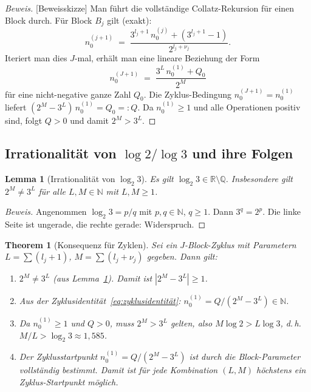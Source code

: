 \documentclass[12pt,a4paper]{article}
\newtheorem{theorem}[definition]{Theorem}
\newtheorem{lemma}[definition]{Lemma}
\newenvironment{beweis}{\begin{proof}[Beweis]}{\end{proof}}
\newcommand{\N}{\mathbb{N}}
\newcommand{\R}{\mathbb{R}}
\newcommand{\Q}{\mathbb{Q}}
\begin{document}
\begin{beweis}[Beweisskizze]
Man führt die vollständige Collatz-Rekursion für einen Block durch.
Für Block $B_j$ gilt (exakt):
\[
  n_0^{(j+1)} \;=\; \frac{3^{l_j+1}\,n_0^{(j)} + (3^{l_j+1}-1)}{2^{l_j+\nu_j}}.
\]
Iteriert man dies $J$-mal, erhält man eine lineare Beziehung der Form
\[
  n_0^{(J+1)} \;=\; \frac{3^L\,n_0^{(1)} + Q_0}{2^M}
\]
für eine nicht-negative ganze Zahl $Q_0$. Die Zyklus-Bedingung
$n_0^{(J+1)} = n_0^{(1)}$ liefert
$(2^M - 3^L)\,n_0^{(1)} = Q_0 =: Q$. Da $n_0^{(1)} \geq 1$ und alle
Operationen positiv sind, folgt $Q > 0$ und damit $2^M > 3^L$.
\end{beweis}

\subsection{Irrationalität von $\log 2 / \log 3$ und ihre Folgen}

\begin{lemma}[Irrationalität von $\log_2 3$]
\label{lem:irrational}
Es gilt $\log_2 3 \in \R \setminus \Q$. Insbesondere gilt $2^M \neq 3^L$
für alle $L, M \in \N$ mit $L, M \geq 1$.
\end{lemma}

\begin{beweis}
Angenommen $\log_2 3 = p/q$ mit $p, q \in \N$, $q \geq 1$. Dann
$3^q = 2^p$. Die linke Seite ist ungerade, die rechte gerade: Widerspruch.
\end{beweis}

\begin{theorem}[Konsequenz für Zyklen]
\label{thm:zyklen-einschränkung}
Sei ein $J$-Block-Zyklus mit Parametern $L = \sum(l_j+1)$,
$M = \sum(l_j+\nu_j)$ gegeben. Dann gilt:
\begin{enumerate}[label=\upshape(\roman*)]
  \item $2^M \neq 3^L$ (aus Lemma~\ref{lem:irrational}). Damit ist
    $|2^M - 3^L| \geq 1$.
  \item Aus der Zyklusidentität~\eqref{eq:zyklusidentität}:
    $n_0^{(1)} = Q/(2^M - 3^L) \in \N$.
  \item Da $n_0^{(1)} \geq 1$ und $Q > 0$, muss $2^M > 3^L$ gelten,
    also $M\log 2 > L\log 3$, d.\,h.\ $M/L > \log_2 3 \approx 1{,}585$.
  \item Der Zyklusstartpunkt $n_0^{(1)} = Q / (2^M - 3^L)$
    ist durch die Block-Parameter \emph{vollständig bestimmt}.
    Damit ist für jede Kombination $(L, M)$ höchstens ein Zyklus-Startpunkt
    möglich.
\end{enumerate}
\end{theorem}
\end{document}

